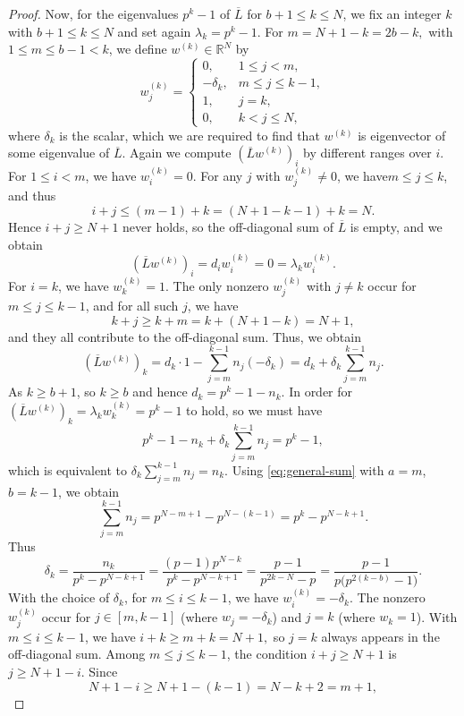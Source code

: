 \documentclass[10pt,a4paper]{amsart}
\begin{document}
\begin{proof}
	\medskip
	
	Now, for the eigenvalues $p^k-1$ of $\overline{L}$ for $b+1\le k\le N$, we fix an integer $k$ with $b+1\le k\le N$ and set again	$\lambda_k=p^k-1$. For $m = N+1-k = 2b-k,$ with $1\le m\le b-1<k$, we define $w^{(k)}\in\mathbb{R}^N$ by
	\begin{equation}\label{eq:w-k}
		w^{(k)}_j =
		\begin{cases}
			0,          & 1\le j<m,\\
			-\delta_k,  & m\le j\le k-1,\\
			1,          & j=k,\\
			0,          & k<j\le N,
		\end{cases}
	\end{equation}
	where $\delta_k$ is the  scalar, which we are required to find that $w^{(k)}$ is eigenvector of some eigenvalue of $\overline{L}$. Again we compute $(\overline{L}w^{(k)})_i$ by different ranges over $i$. For $1\le i<m$, we have $w^{(k)}_i=0$. For any $j$ with $w^{(k)}_j\ne0$, we have$m\le j\le k$, and thus
	\[
	i+j \le (m-1)+k = (N+1-k-1)+k = N.
	\]
	Hence $i+j\ge N+1$ never holds, so the off-diagonal sum of $\overline{L}$ is empty,  and we obtain
	\[
	(\overline{L}w^{(k)})_i = d_i w^{(k)}_i = 0 = \lambda_k w^{(k)}_i.
	\]
	For $i=k$, we have $w^{(k)}_k=1$. The only nonzero $w^{(k)}_j$ with $j\ne k$ occur
	for $m\le j\le k-1$, and for all such $j$,  we have
	\[
	k+j \ge k+m = k+(N+1-k)=N+1,
	\]
	and they all contribute to the off-diagonal sum. Thus, we obtain
	\[
	(\overline{L}w^{(k)})_k
	= d_k\cdot 1 - \sum_{j=m}^{k-1} n_j(-\delta_k)
	= d_k + \delta_k\sum_{j=m}^{k-1} n_j.
	\]
	As $k\ge b+1$, so $k\ge b$ and hence $d_k=p^k-1-n_k$. In order for $(\overline{L}w^{(k)})_k=\lambda_k w^{(k)}_k=p^k-1$ to hold, so we must have
	\[
	p^k-1-n_k + \delta_k\sum_{j=m}^{k-1}n_j = p^k-1,
	\]
	which is equivalent to $\delta_k\sum_{j=m}^{k-1}n_j = n_k.$
	Using \eqref{eq:general-sum} with $a=m$, $b=k-1$, we obtain
	\[
	\sum_{j=m}^{k-1} n_j
	= p^{N-m+1}-p^{N-(k-1)}
	= p^{k}-p^{N-k+1}.
	\]
	Thus
	\[
	\delta_k
	= \frac{n_k}{p^k-p^{N-k+1}}
	= \frac{(p-1)p^{N-k}}{p^k-p^{N-k+1}}= \frac{p-1}{p^{2k-N}-p}
	= \frac{p-1}{p\bigl(p^{2(k-b)}-1\bigr)}.
	\]
	With the choice of $\delta_k$, for $m\le i\le k-1$, we have  $w^{(k)}_i=-\delta_k$. The nonzero $w^{(k)}_j$ occur for $j\in[m,k-1]$ (where $w_j=-\delta_k$) and $j=k$ (where $w_k=1$). With	$m\le i\le k-1$, we have $i+k \ge m+k = N+1,$	so $j=k$ always appears in the off-diagonal sum. Among $m\le j\le k-1$, the condition $i+j\ge N+1$ is $j\ge N+1-i$. Since
	\[
	N+1-i \ge N+1-(k-1) = N-k+2 = m+1,
\]
\end{proof}
\end{document}
